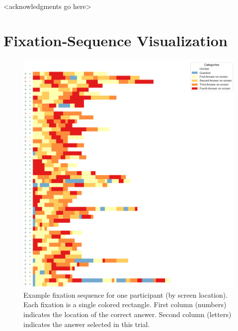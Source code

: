 \documentclass[manuscript,review,anonymous]{acmart}
\begin{document}
\begin{acks}
 <acknowledgments go here>

\end{acks}





\appendix

    \section{Fixation‐Sequence Visualization}
    \label{app:fixseq}
    
    \begin{figure}[H]
      \centering
      \includegraphics[width=1\textwidth]{plots/random_p_by_loc.png}
      \caption{Example fixation sequence for one participant (by screen location). Each fixation is a single colored rectangle. First column (numbers) indicates the location of the correct answer. Second column (letters) indicates the answer selected in this trial.}
      \label{fig:fixseq1}
    \end{figure}
    
\end{document}
